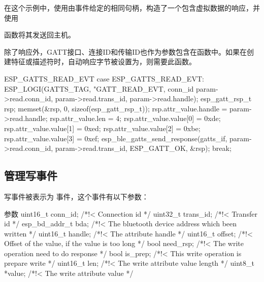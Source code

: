 \documentclass[lang=cn,newtx,10pt,scheme=chinese]{elegantbook}
\begin{document}
在这个示例中，使用由事件给定的相同句柄，构造了一个包含虚拟数据的响应，并使用


函数将其发送回主机。

除了响应外，GATT接口、连接ID和传输ID也作为参数包含在函数中。如果在创建特征或描述符时，自动响应字节被设置为，则需要此函数。

\begin{mycode}{ESP\_GATTS\_READ\_EVT}
case ESP_GATTS_READ_EVT: {
     ESP_LOGI(GATTS_TAG, "GATT_READ_EVT, conn_id %
              param->read.conn_id, param->read.trans_id, param->read.handle);  
              esp_gatt_rsp_t rsp;  
              memset(&rsp, 0, sizeof(esp_gatt_rsp_t));  
              rsp.attr_value.handle = param->read.handle;  
              rsp.attr_value.len = 4;  
              rsp.attr_value.value[0] = 0xde;  
              rsp.attr_value.value[1] = 0xed;  
              rsp.attr_value.value[2] = 0xbe;  
              rsp.attr_value.value[3] = 0xef;  
              esp_ble_gatts_send_response(gatts_if,  
                                          param->read.conn_id,  
                                          param->read.trans_id,  
                                          ESP_GATT_OK, &rsp);
     break;
    }
\end{mycode}

\subsection{管理写事件}

写事件被表示为  事件，这个事件有以下参数：

\begin{mycode}{参数}
uint16_t conn_id;         /*!< Connection id */
uint32_t trans_id;        /*!< Transfer id */
esp_bd_addr_t bda;        /*!< The bluetooth device address which been written */
uint16_t handle;          /*!< The attribute handle */
uint16_t offset;          /*!< Offset of the value, if the value is too long */
bool need_rsp;            /*!< The write operation need to do response */
bool is_prep;             /*!< This write operation is prepare write */
uint16_t len;             /*!< The write attribute value length */
uint8_t *value;           /*!< The write attribute value */
\end{mycode}
\end{document}
